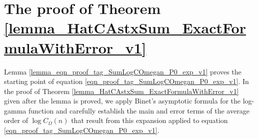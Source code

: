 \documentclass[11pt,reqno,a4letter]{article}
\newcommand{\hlocalref}[1]{\hyperref[#1]{\ref{#1}}}
\numberwithin{equation}{section}
\numberwithin{figure}{section}
\numberwithin{table}{section}
\theoremstyle{plain}
\numberwithin{theorem}{section}
\theoremstyle{definition}
\theoremstyle{remark}
\begin{document}
\section{The proof of Theorem \hlocalref{lemma_HatCAstxSum_ExactFormulaWithError_v1}} 
\label{Appendix_ProofOfCOmegan_LogarithmicAvgOrderFormula}

Lemma \hlocalref{lemma_eqn_proof_tag_SumLogCOmegan_P0_exp_v1} 
proves the starting point of 
equation \eqref{eqn_proof_tag_SumLogCOmegan_P0_exp_v1}. 
In the proof of Theorem \hlocalref{lemma_HatCAstxSum_ExactFormulaWithError_v1} 
given after the lemma is proved, we apply Binet's asymptotic formula for the 
log-gamma function and carefully establish the main and error terms of the 
average order of $\log C_{\Omega}(n)$ that result from this expansion applied to 
equation \eqref{eqn_proof_tag_SumLogCOmegan_P0_exp_v1}. 
\end{document}

